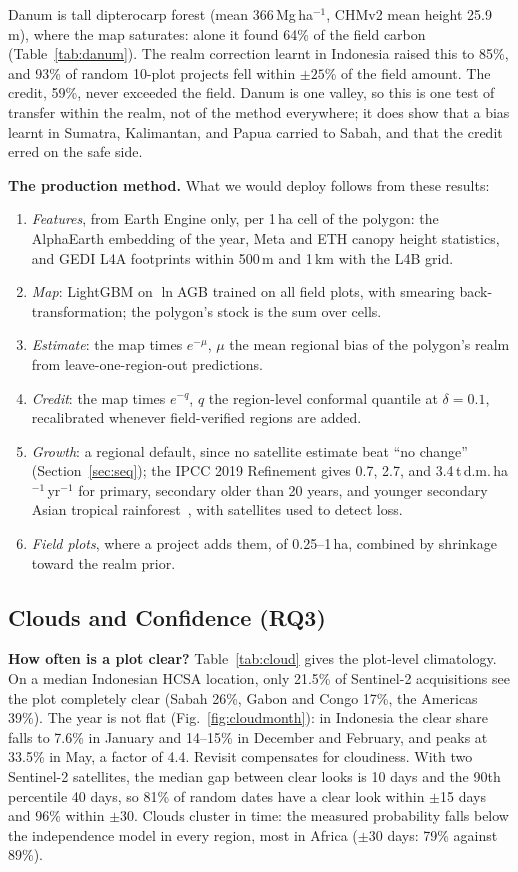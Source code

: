 \documentclass[conference,a4paper]{IEEEtran}
\newcommand{\Mgha}{\,Mg\,ha$^{-1}$}
\begin{document}
Danum is tall dipterocarp forest (mean 366\Mgha, CHMv2 mean height 25.9\,m), where the map saturates: alone it found 64\% of the field carbon (Table~\ref{tab:danum}). The realm correction learnt in Indonesia raised this to 85\%, and 93\% of random 10-plot projects fell within $\pm25$\% of the field amount. The credit, 59\%, never exceeded the field. Danum is one valley, so this is one test of transfer within the realm, not of the method everywhere; it does show that a bias learnt in Sumatra, Kalimantan, and Papua carried to Sabah, and that the credit erred on the safe side.

\textbf{The production method.} What we would deploy follows from these results:
\begin{enumerate}
\item \emph{Features}, from Earth Engine only, per 1\,ha cell of the polygon: the AlphaEarth embedding of the year, Meta and ETH canopy height statistics, and GEDI L4A footprints within 500\,m and 1\,km with the L4B grid.
\item \emph{Map}: LightGBM on $\ln$AGB trained on all field plots, with smearing back-transformation; the polygon's stock is the sum over cells.
\item \emph{Estimate}: the map times $e^{-\mu}$, $\mu$ the mean regional bias of the polygon's realm from leave-one-region-out predictions.
\item \emph{Credit}: the map times $e^{-q}$, $q$ the region-level conformal quantile at $\delta=0.1$, recalibrated whenever field-verified regions are added.
\item \emph{Growth}: a regional default, since no satellite estimate beat ``no change'' (Section~\ref{sec:seq}); the IPCC 2019 Refinement gives 0.7, 2.7, and 3.4\,t\,d.m.\,ha$^{-1}$\,yr$^{-1}$ for primary, secondary older than 20 years, and younger secondary Asian tropical rainforest~\cite{ipcc2019v4}, with satellites used to detect loss.
\item \emph{Field plots}, where a project adds them, of 0.25--1\,ha, combined by shrinkage toward the realm prior.
\end{enumerate}

\subsection{Clouds and Confidence (RQ3)}
\label{sec:rq3}
\textbf{How often is a plot clear?} Table~\ref{tab:cloud} gives the plot-level climatology. On a median Indonesian HCSA location, only 21.5\% of Sentinel-2 acquisitions see the plot completely clear (Sabah 26\%, Gabon and Congo 17\%, the Americas 39\%). The year is not flat (Fig.~\ref{fig:cloudmonth}): in Indonesia the clear share falls to 7.6\% in January and 14--15\% in December and February, and peaks at 33.5\% in May, a factor of 4.4. Revisit compensates for cloudiness. With two Sentinel-2 satellites, the median gap between clear looks is 10 days and the 90th percentile 40 days, so 81\% of random dates have a clear look within $\pm$15 days and 96\% within $\pm$30. Clouds cluster in time: the measured probability falls below the independence model in every region, most in Africa ($\pm$30 days: 79\% against 89\%).
\end{document}
